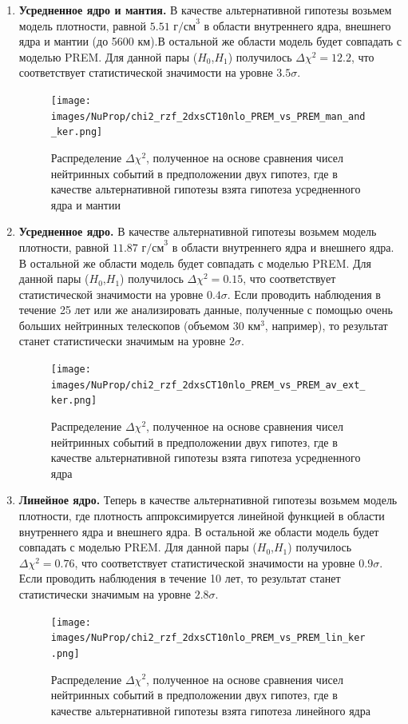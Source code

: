 \begin{enumerate}
    \item \textbf{Усредненное ядро и мантия.} В качестве альтернативной гипотезы возьмем модель плотности, равной $5.51\text{ г/см}^3$ в области внутреннего ядра, внешнего ядра и мантии (до 5600 км).В остальной же области модель будет совпадать с моделью PREM. Для данной пары ($H_0$,$H_1$) получилось $\Delta\chi^2 = 12.2$, что соответствует статистической значимости на уровне $3.5\sigma$.   
    \begin{figure}[!h]
    \centering
    \texttt{[image: images/NuProp/chi2\_rzf\_2dxsCT10nlo\_PREM\_vs\_PREM\_man\_and\_ker.png]}
    \caption{Распределение $\Delta\chi^2$, полученное на основе сравнения чисел нейтринных событий в предположении двух гипотез, где в качестве альтернативной гипотезы взята гипотеза усредненного ядра и мантии}
    \label{NuTom1}
    \end{figure}
    \item \textbf{Усредненное ядро.} В качестве альтернативной гипотезы возьмем модель плотности, равной $11.87\text{ г/см}^3$ в области внутреннего ядра и внешнего ядра. В остальной же области модель будет совпадать с моделью PREM. Для данной пары ($H_0$,$H_1$) получилось $\Delta\chi^2 = 0.15$, что соответствует статистической значимости на уровне $0.4\sigma$. Если проводить наблюдения в течение 25 лет или же анализировать данные, полученные с помощью очень больших нейтринных телескопов (объемом $30 \text{ км}^3$, например), то результат станет статистически значимым на уровне $2\sigma$.   
    \begin{figure}[!h]
    \centering
    \texttt{[image: images/NuProp/chi2\_rzf\_2dxsCT10nlo\_PREM\_vs\_PREM\_av\_ext\_ker.png]}
    \caption{Распределение $\Delta\chi^2$, полученное на основе сравнения чисел нейтринных событий в предположении двух гипотез, где в качестве альтернативной гипотезы взята гипотеза усредненного ядра}
    \label{NuTom2}
    \end{figure}
    \item \textbf{Линейное ядро.} Теперь в качестве альтернативной гипотезы возьмем модель плотности,  где плотность аппроксимируется линейной функцией в области внутреннего ядра и внешнего ядра. В остальной же области модель будет совпадать с моделью PREM. Для данной пары ($H_0$,$H_1$) получилось $\Delta\chi^2 = 0.76$, что соответствует статистической значимости на уровне $0.9\sigma$. Если проводить наблюдения в течение 10 лет, то результат станет статистически значимым на уровне $2.8\sigma$. 
    \begin{figure}[!h]
    \centering
    \texttt{[image: images/NuProp/chi2\_rzf\_2dxsCT10nlo\_PREM\_vs\_PREM\_lin\_ker.png]}
    \caption{Распределение $\Delta\chi^2$, полученное на основе сравнения чисел нейтринных событий в предположении двух гипотез, где в качестве альтернативной гипотезы взята гипотеза линейного ядра}
    \label{NuTom3}
    \end{figure}
\end{enumerate}
